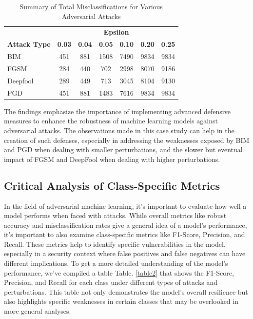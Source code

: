 \documentclass[10pt, conference, a4paper, final]{IEEEtran}
\begin{document}
\begin{table}[ht]
    \centering
    \caption{Summary of Total Misclassifications for Various Adversarial Attacks}
    \label{tab:misclassifications}
    \begin{tabular}{|l|c|c|c|c|c|c|}
    \hline
    & \multicolumn{6}{c|}{\textbf{Epsilon}} \\ \cline{2-7} 
    \multirow{-2}{*}{\textbf{Attack Type}} & \textbf{0.03} & \textbf{0.04} & \textbf{0.05} & \textbf{0.10} & \textbf{0.20} & \textbf{0.25} \\ \hline
    BIM & 451 & 881 & 1508 & 7490 & 9834 & 9834 \\ \hline
    FGSM & 284 & 440 & 702 & 2998 & 8070 & 9186 \\ \hline
    Deepfool & 289 & 449 & 713 & 3045 & 8104 & 9130 \\ \hline
    PGD & 451 & 881 & 1483 & 7616 & 9834 & 9834 \\ \hline
    \end{tabular}
\end{table}

The findings emphasize the importance of implementing advanced defensive measures to enhance the robustness of machine learning models against 
adversarial attacks. The observations made in this case study can help in the creation of such defenses, especially in addressing the weaknesses exposed by BIM and PGD when dealing with smaller perturbations, and the slower but eventual impact of FGSM and DeepFool when dealing with higher perturbations.

\subsection{Critical Analysis of Class-Specific Metrics}

In the field of adversarial machine learning, it's important to evaluate how well a model performs when faced with attacks. While overall metrics like robust accuracy and misclassification rates give a general idea of a model's performance, it's important to also examine class-specific metrics like F1-Score, Precision, and Recall. These metrics help to identify specific vulnerabilities in the model, especially in a security context where false positives and false negatives can have different implications. To get a more detailed understanding of the model's performance, we've compiled a table Table. \ref{table2} that shows the F1-Score, Precision, and Recall for each class under different types of attacks and perturbations. This table not only demonstrates the model's overall resilience but also highlights specific weaknesses in certain classes that may be overlooked in more general analyses.
\end{document}
